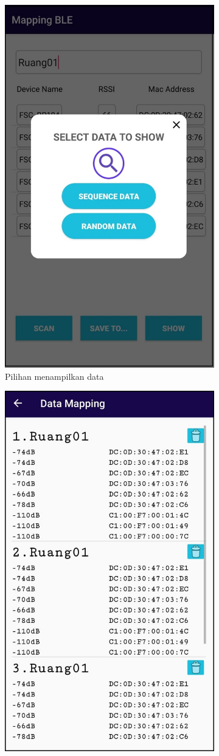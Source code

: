 \begin{enumerate}[a.]
\begin{figure} [H]
\begin{subfigure}{.5\textwidth}
			      \includegraphics[width=.5\linewidth]{gambar/android/mapping-show-data}
			      \caption{Pilihan menampilkan data}
		      \end{subfigure}
		      \vspace{1cm}
		      \newline
		      \begin{subfigure}{.5\textwidth}
			      \centering
			      \includegraphics[width=.5\linewidth]{gambar/android/mapping-data-list}

\end{subfigure}
\end{figure}
\end{enumerate}
